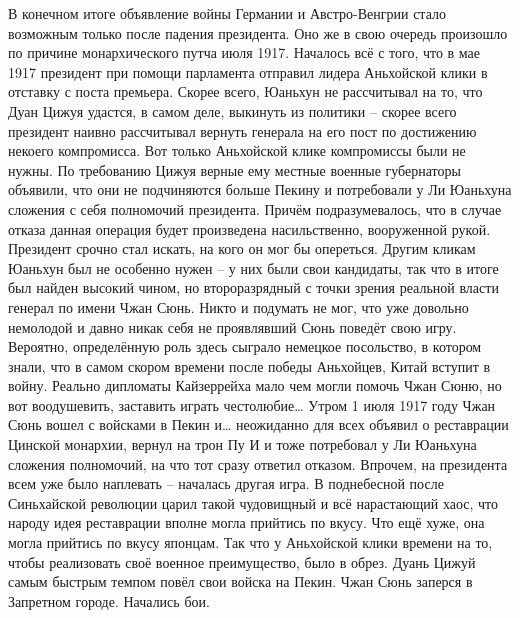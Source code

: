 В конечном итоге объявление войны Германии и Австро-Венгрии стало возможным только после падения президента. Оно же в свою очередь произошло по причине монархического путча июля 1917. Началось всё с того, что в мае 1917 президент при помощи парламента отправил лидера Аньхойской клики в отставку с поста премьера. Скорее всего, Юаньхун не рассчитывал на то, что Дуан Цижуя удастся, в самом деле, выкинуть из политики – скорее всего президент наивно рассчитывал вернуть генерала на его пост по достижению некоего компромисса. Вот только Аньхойской клике компромиссы были не нужны. По требованию Цижуя верные ему местные военные губернаторы объявили, что они не подчиняются больше Пекину и потребовали у Ли Юаньхуна сложения с себя полномочий президента. Причём подразумевалось, что в случае отказа данная операция будет произведена насильственно, вооруженной рукой. Президент срочно стал искать, на кого он мог бы опереться. Другим кликам Юаньхун был не особенно нужен – у них были свои кандидаты, так что в итоге был найден высокий чином, но второразрядный с точки зрения реальной власти генерал по имени Чжан Сюнь. Никто и подумать не мог, что уже довольно немолодой и давно никак себя не проявлявший Сюнь поведёт свою игру. Вероятно, определённую роль здесь сыграло немецкое посольство, в котором знали, что в самом скором времени после победы Аньхойцев, Китай вступит в войну. Реально дипломаты Кайзеррейха мало чем могли помочь Чжан Сюню, но вот воодушевить, заставить играть честолюбие… Утром 1 июля 1917 году Чжан Сюнь вошел с войсками в Пекин и… неожиданно для всех объявил о реставрации Цинской монархии, вернул на трон Пу И и тоже потребовал у Ли Юаньхуна сложения полномочий, на что тот сразу ответил отказом. Впрочем, на президента всем уже было наплевать – началась другая игра. В поднебесной после Синьхайской революции царил такой чудовищный и всё нарастающий хаос, что народу идея реставрации вполне могла прийтись по вкусу. Что ещё хуже, она могла прийтись по вкусу японцам. Так что у Аньхойской клики времени на то, чтобы реализовать своё военное преимущество, было в обрез. Дуань Цижуй самым быстрым темпом повёл свои войска на Пекин. Чжан Сюнь заперся в Запретном городе. Начались бои. 

